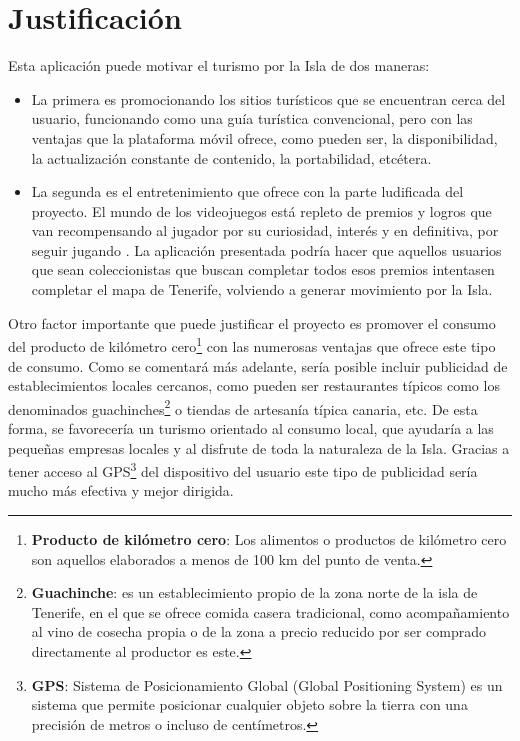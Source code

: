 

\section{Justificación}

Esta aplicación puede motivar el turismo por la Isla de dos maneras:
\begin{itemize}
\item La primera es promocionando los sitios turísticos que se encuentran cerca del usuario, funcionando como una guía turística convencional, pero con las ventajas que la plataforma móvil ofrece, como pueden ser, la disponibilidad, la actualización constante de contenido, la portabilidad, etcétera.

\item La segunda es el entretenimiento que ofrece con la parte ludificada del proyecto. El mundo de los videojuegos está repleto de premios y logros que van recompensando al jugador por su curiosidad, interés y en definitiva, por seguir jugando \cite{porquenosgustanvideojuegos}. La aplicación presentada podría hacer que aquellos usuarios que sean coleccionistas que buscan completar todos esos premios intentasen completar el mapa de Tenerife, volviendo a generar movimiento por la Isla.

\end{itemize}

Otro factor importante que puede justificar el proyecto es promover el consumo del producto de kilómetro cero\footnote{\textbf{Producto de kilómetro cero}: Los alimentos o productos de kilómetro cero son aquellos elaborados a menos de 100 km del punto de venta.} con las numerosas ventajas que ofrece este tipo de consumo. \cite{kilometro0} Como se comentará más adelante, sería posible incluir publicidad de establecimientos locales cercanos, como pueden ser restaurantes típicos como los denominados guachinches\footnote{\textbf{Guachinche}: es un establecimiento propio de la zona norte de la isla de Tenerife, en el que se ofrece comida casera tradicional, como acompañamiento al vino de cosecha propia o de la zona a precio reducido por ser comprado directamente al productor es este.} o tiendas de artesanía típica canaria, etc. De esta forma, se favorecería un turismo orientado al consumo local, que ayudaría a las pequeñas empresas locales y al disfrute de toda la naturaleza de la Isla. Gracias a tener acceso al GPS\footnote{\textbf{GPS}: Sistema de Posicionamiento Global (Global Positioning System) es un sistema que permite posicionar cualquier objeto sobre la tierra con una precisión de metros o incluso de centímetros.} del dispositivo del usuario este tipo de publicidad sería mucho más efectiva y mejor dirigida.

